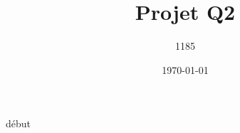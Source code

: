 \documentclass[11pt,a4paper]{report}
\author{1185}
\title{Projet Q2}
\date{\today}
\begin{document}
\maketitle
début
\end{document}
